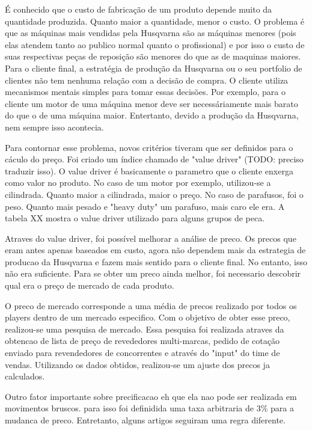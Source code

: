 \documentclass[12pt]{article}
\begin{document}
	É conhecido que o custo de fabricação de um produto depende muito da quantidade produzida. Quanto maior a quantidade, menor o custo. O problema é que as máquinas mais vendidas pela Husqvarna são as máquinas menores (pois elas atendem tanto ao publico normal quanto o profissional) e por isso o custo de suas respectivas peças de reposição são menores do que as de maquinas maiores. Para o cliente final, a estratégia de produção da Husqvarna ou o seu portfolio de clientes não tem nenhuma relação com a decisão de compra. O cliente utiliza mecanismos mentais simples para tomar essas decisões. Por exemplo, para o cliente um motor de uma máquina menor deve ser necessáriamente mais barato do que o de uma máquina maior. Entertanto, devido a produção da Husqvarna, nem sempre isso acontecia.

	Para contornar esse problema, novos critérios tiveram que ser definidos para o cáculo do preço. Foi criado um índice chamado de "value driver" (TODO: preciso traduzir isso). O value driver é basicamente o parametro que o cliente enxerga como valor no produto. No caso de um motor por exemplo, utilizou-se a cilindrada. Quanto maior a cilindrada, maior o preço. No caso de parafusos, foi o peso. Quanto mais pesado e "heavy duty" um parafuso, mais caro ele era. A tabela XX mostra o value driver utilizado para alguns grupos de peca.


	Atraves do value driver, foi possível melhorar a análise de preco. Os precos que eram antes apenas baseados em custo, agora não dependem mais da estrategia de producao da Husqvarna e fazem mais sentido para o cliente final. No entanto, isso não era suficiente. Para se obter um preco ainda melhor, foi necessario descobrir qual era o preço de mercado de cada produto.

	O preco de mercado corresponde a uma média de precos realizado por todos os players dentro de um mercado especifico. Com o objetivo de obter esse preco, realizou-se uma pesquisa de mercado. Essa pesquisa foi realizada atraves da obtencao de lista de preço de revededores multi-marcas, pedido de cotação enviado para revendedores de concorrentes e através do "input" do time de vendas. Utilizando os dados obtidos, realizou-se um ajuste dos precos ja calculados.

	Outro fator importante sobre precificacao eh que ela nao pode ser realizada em movimentos bruscos. para isso foi definidida uma taxa arbitraria de 3\% para a mudanca de preco. Entretanto, alguns artigos seguiram uma regra diferente.
\end{document}
